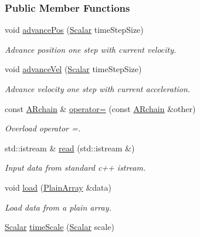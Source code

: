 \subsubsection*{Public Member Functions}
\begin{DoxyCompactItemize}
\item 
void \mbox{\hyperlink{class_a_rchain_a8d3ac75a6b4231e0859492257553316e}{advance\+Pos}} (\mbox{\hyperlink{class_a_rchain_a707e42a79e4744424a34c9007e84ee07}{Scalar}} time\+Step\+Size)
\begin{DoxyCompactList}\small\item\em Advance position one step with current velocity. \end{DoxyCompactList}\item 
void \mbox{\hyperlink{class_a_rchain_a6a76ab7a095adfbf4a69226a31d866d4}{advance\+Vel}} (\mbox{\hyperlink{class_a_rchain_a707e42a79e4744424a34c9007e84ee07}{Scalar}} time\+Step\+Size)
\begin{DoxyCompactList}\small\item\em Advance velocity one step with current acceleration. \end{DoxyCompactList}\item 
const \mbox{\hyperlink{class_a_rchain}{A\+Rchain}} \& \mbox{\hyperlink{class_a_rchain_a7bcc783f99cad1e9113d2b505544aba1}{operator=}} (const \mbox{\hyperlink{class_a_rchain}{A\+Rchain}} \&other)
\begin{DoxyCompactList}\small\item\em Overload operator =. \end{DoxyCompactList}\item 
std\+::istream \& \mbox{\hyperlink{class_a_rchain_a86bd89bacf59c9c3bb0594499db82e04}{read}} (std\+::istream \&)
\begin{DoxyCompactList}\small\item\em Input data from standard c++ istream. \end{DoxyCompactList}\item 
void \mbox{\hyperlink{class_a_rchain_a7edf1240a094d55df222c816659dced0}{load}} (\mbox{\hyperlink{class_a_rchain_a829aca51411c08ffd518294770a374d5}{Plain\+Array}} \&data)
\begin{DoxyCompactList}\small\item\em Load data from a plain array. \end{DoxyCompactList}\item 
\mbox{\hyperlink{class_a_rchain_a707e42a79e4744424a34c9007e84ee07}{Scalar}} \mbox{\hyperlink{class_a_rchain_a979a40abd086aeb411dc8e82a3bb1cdf}{time\+Scale}} (\mbox{\hyperlink{class_a_rchain_a707e42a79e4744424a34c9007e84ee07}{Scalar}} scale)

\end{DoxyCompactItemize}
